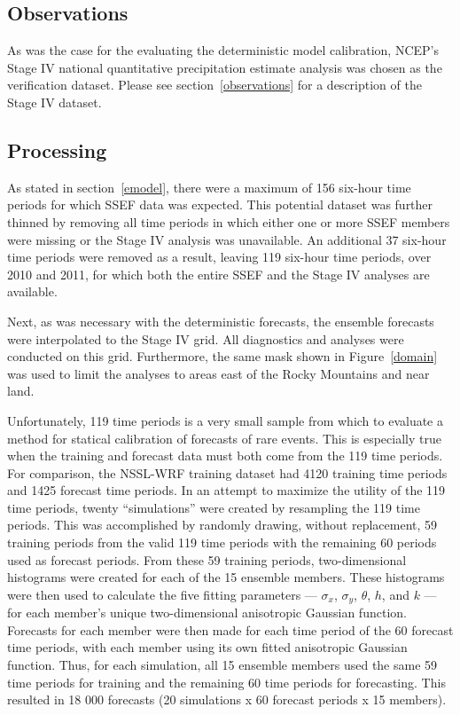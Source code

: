 \subsection{Observations}
\label{eobservations}

As was the case for the evaluating the deterministic model calibration, NCEP's Stage IV national quantitative precipitation estimate analysis was chosen as the verification dataset.
Please see \mbox{section \ref{observations}} for a description of the Stage IV dataset.




\subsection{Processing}
\label{eprocessing}

As stated in \mbox{section \ref{emodel}}, there were a maximum of 156 six-hour time periods for which SSEF data was expected.
This potential dataset was further thinned by removing all time periods in which either one or more SSEF members were missing or the Stage IV analysis was unavailable.
An additional 37 six-hour time periods were removed as a result, leaving 119 six-hour time periods, over 2010 and 2011, for which both the entire SSEF and the Stage IV analyses are available.


Next, as was necessary with the deterministic forecasts, the ensemble forecasts were interpolated to the Stage IV grid.
All diagnostics and analyses were conducted on this grid.
Furthermore, the same mask shown in \mbox{Figure \ref{domain}} was used to limit the analyses to areas east of the Rocky Mountains and near land.


Unfortunately, 119 time periods is a very small sample from which to evaluate a method for statical calibration of forecasts of rare events.
This is especially true when the training and forecast data must both come from the 119 time periods.
For comparison, the NSSL-WRF training dataset had 4120 training time periods and 1425 forecast time periods.
In an attempt to maximize the utility of the 119 time periods, twenty ``simulations'' were created by resampling the 119 time periods.
This was accomplished by randomly drawing, without replacement, 59 training periods from the valid 119 time periods with the remaining 60 periods used as forecast periods.
From these 59 training periods, two-dimensional histograms were created for each of the 15 ensemble members.
These histograms were then used to calculate the five fitting parameters --- $\sigma_x$, $\sigma_y$, $\theta$, $h$, and $k$ --- for each member's unique two-dimensional anisotropic Gaussian function.
Forecasts for each member were then made for each time period of the 60 forecast time periods, with each member using its own fitted anisotropic Gaussian function.
Thus, for each simulation, all 15 ensemble members used the same 59 time periods for training and the remaining 60 time periods for forecasting.
This resulted in 18 000 forecasts (20 simulations x 60 forecast periods x 15 members).






